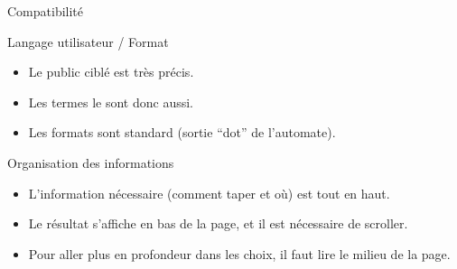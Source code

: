 \begin{frame}{Compatibilité}

  \begin{block}{Langage utilisateur / Format}
    \begin{itemize}
    \item Le public ciblé est très précis.
    \item Les termes le sont donc aussi.
    \item Les formats sont standard (sortie ``dot'' de l'automate).
    \end{itemize}
  \end{block}


  \begin{block}{Organisation des informations}
    \begin{itemize}
    \item L'information nécessaire (comment taper et où) est tout en haut.
    \item Le résultat s'affiche en bas de la page, et il est
      nécessaire de scroller.
    \item Pour aller plus en profondeur dans les choix, il faut lire
      le milieu de la page.
    \end{itemize}
  \end{block}


\end{frame}
